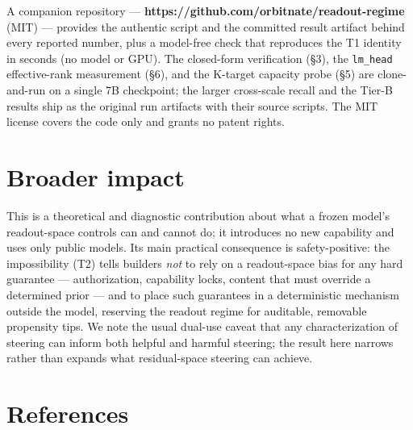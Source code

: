 \documentclass[11pt]{article}
\theoremstyle{plain}
\theoremstyle{definition}
\begin{document}
A companion repository --- \textbf{https://github.com/orbitnate/readout-regime} (MIT) --- provides the authentic script and the committed result artifact behind every reported number, plus a model-free check that reproduces the T1 identity in seconds (no model or GPU). The closed-form verification (\S 3), the \texttt{lm\_head} effective-rank measurement (\S 6), and the K-target capacity probe (\S 5) are clone-and-run on a single 7B checkpoint; the larger cross-scale recall and the Tier-B results ship as the original run artifacts with their source scripts. The MIT license covers the code only and grants no patent rights.

\section*{Broader impact}

This is a theoretical and diagnostic contribution about what a frozen model's readout-space controls can and cannot do; it introduces no new capability and uses only public models. Its main practical consequence is safety-positive: the impossibility (T2) tells builders \emph{not} to rely on a readout-space bias for any hard guarantee --- authorization, capability locks, content that must override a determined prior --- and to place such guarantees in a deterministic mechanism outside the model, reserving the readout regime for auditable, removable propensity tips. We note the usual dual-use caveat that any characterization of steering can inform both helpful and harmful steering; the result here narrows rather than expands what residual-space steering can achieve.

\section*{References}
\end{document}
